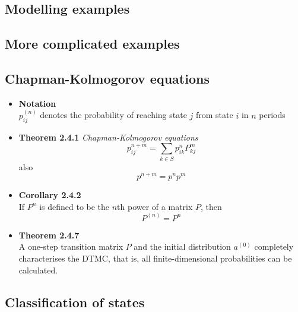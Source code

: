 \documentclass[11pt,a4paper]{article}
\begin{document}
\subsection{Modelling examples}

\subsection{More complicated examples }

\subsection{Chapman-Kolmogorov equations}

\begin{itemize}

    \item \textbf{Notation} \\
        $p_{ij}^{(n)}$ denotes the probability of reaching state $j$ from state $i$ in $n$ periods

    \item \textbf{Theorem 2.4.1} \emph{Chapman-Kolmogorov equations} \\
        \[
            p_{ij}^{n+m} = \sum_{k\in S} {p_{ik}^n} {P_{kj}^m}
        \]
        also
        \[
            p^{n+m} = {p^n}{p^m}
        \]

    \item \textbf{Corollary 2.4.2} \\
        If $P^n$ is defined to be the $n$th power of a matrix $P$, then
        \[ P^{(n)} = P^n \]

    \item \textbf{Theorem 2.4.7} \\
        A one-step transition matrix $P$ and the initial distribution $a^{(0)}$ completely
        characterises the DTMC, that is, all finite-dimensional probabilities can be calculated.

\end{itemize}

\subsection{Classification of states}
\end{document}
